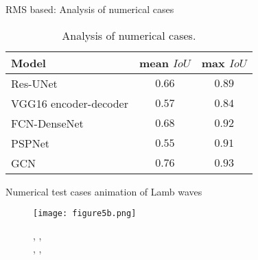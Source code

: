 \documentclass[10pt,aspectratio=169]{beamer} %
\begin{document}
\begin{frame}{RMS based: Analysis of numerical cases}
	\begin{table}[ht!]
		\centering
		\caption{Analysis of numerical cases.}
		\label{tab:table_all_numerical_cases}	
		\begin{tabular}{lcc}
			\toprule
			Model & mean \(IoU\) & max \(IoU\) \\ 
			\midrule 
			Res-UNet & \(0.66\) & \(0.89\) \\ 
			VGG16 encoder-decoder & \(0.57\) & \(0.84\) \\ 
			FCN-DenseNet & \(0.68\) & \(0.92\) \\ 
			PSPNet & \(0.55\) & \(0.91\) \\ 
			GCN & \(0.76\) & \(0.93\) \\ 
			\bottomrule
		\end{tabular}
	\end{table}
\end{frame}
\setcounter{subfigure}{0}
\begin{frame}{Numerical test cases animation of Lamb waves}
	\begin{minipage}[t]{.3\textwidth}
	\begin{figure}
		\centering
		\texttt{[image: figure5b.png]}
	\end{figure}
	\end{minipage}
	\begin{minipage}[t]{.65\textwidth}
		\begin{figure}
			,
			,
			\\
			,
			,
		\end{figure}	
	\end{minipage}
\end{frame}
\end{document}
